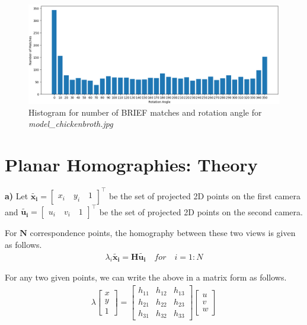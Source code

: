 \documentclass[a4paper]{article}
\begin{document}
\begin{figure}[!htb]
    \centering
    \includegraphics[width=\textwidth]{images/rotation_matches_histogram}
    \caption{Histogram for number of BRIEF matches and rotation angle for \textit{model\_chickenbroth.jpg}}
\end{figure}

\clearpage
\section{Planar Homographies: Theory}

\textbf{a)} Let $\mathbf{\tilde{x_i}} = \begin{bmatrix}
  x_i \quad y_i \quad 1
\end{bmatrix}^\top$ be the set of projected 2D points on the first camera and 
$\mathbf{\tilde{u_i}} = \begin{bmatrix}
  u_i \quad v_i \quad 1
\end{bmatrix}^\top$ be the set of projected 2D points on the second camera.

For $\mathbf{N}$ correspondence points, the homography between these two views is given as follows.
\begin{gather}
\lambda_i\mathbf{\tilde{x_i}} = \mathbf{H}\mathbf{\tilde{u_i}} \quad for \quad i=1:N 
\end{gather}

For any two given points, we can write the above in a matrix form as follows.
\begin{gather}
    \lambda
    \begin{bmatrix}
    x \\ y \\ 1
    \end{bmatrix} = 
    \begin{bmatrix}
  h_{11} & h_{12} & h_{13} \\
  h_{21} & h_{22} & h_{23} \\
  h_{31} & h_{32} & h_{33}
 \end{bmatrix}
    \begin{bmatrix}
    u \\ v \\ w
    \end{bmatrix}
\end{gather}
\end{document}
